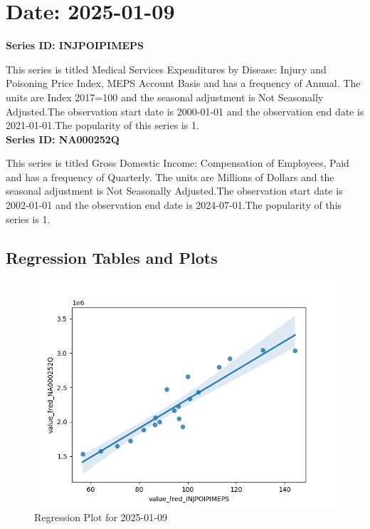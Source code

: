\section{Date: 2025-01-09}
\noindent \textbf{Series ID: INJPOIPIMEPS} 

\noindent This series is titled Medical Services Expenditures by Disease: Injury and Poisoning Price Index, MEPS Account Basis and has a frequency of Annual. The units are Index 2017=100 and the seasonal adjustment is Not Seasonally Adjusted.The observation start date is 2000-01-01 and the observation end date is 2021-01-01.The popularity of this series is 1. \\ 

\noindent \textbf{Series ID: NA000252Q} 

\noindent This series is titled Gross Domestic Income: Compensation of Employees, Paid and has a frequency of Quarterly. The units are Millions of Dollars and the seasonal adjustment is Not Seasonally Adjusted.The observation start date is 2002-01-01 and the observation end date is 2024-07-01.The popularity of this series is 1. \\ 

\subsection{Regression Tables and Plots}


\begin{figure}
\centering
\includegraphics[scale = 0.9]{plots/plot_2025-01-09.png}
\caption{Regression Plot for 2025-01-09}
\end{figure}
\newpage
